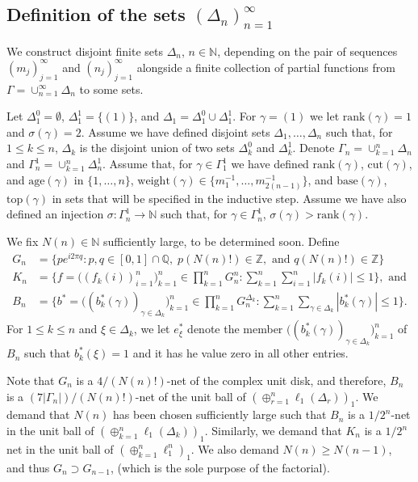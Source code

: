 \documentclass[11pt]{amsart}
\theoremstyle{definition}
\newcommand{\N}{\mathbb{N}}
\newcommand{\Z}{\mathbb{Z}}
\numberwithin{equation}{section}
\begin{document}
\subsection{Definition of the sets $(\Delta_n)_{n=1}^\infty$}
We construct disjoint finite sets $\Delta_n$, $n\in\N$, depending on the pair of sequences $(m_j)_{j=1}^\infty$ and $(n_j)_{j=1}^\infty$ alongside a finite collection of partial functions from $\Gamma = \cup_{n=1}^\infty\Delta_n$ to some sets.

Let $\Delta_1^0 = \emptyset$, $\Delta_1^1 = \{(1)\}$, and $\Delta_1 = \Delta_1^0\cup\Delta_1^1$. For $\gamma = (1)$ we let $\mathrm{rank}(\gamma) = 1$ and $\sigma(\gamma) = 2$. Assume we have defined disjoint sets $\Delta_1,\ldots,\Delta_n$ such that, for $1\leq k\leq n$, $\Delta_k$ is the disjoint union of two sets $\Delta_k^0$ and $\Delta_k^1$. Denote $\Gamma_n = \cup_{k=1}^n\Delta_n$ and $\Gamma^1_n = \cup_{k=1}^n\Delta^1_n$. Assume that, for $\gamma\in\Gamma_1^1$ we have defined $\mathrm{rank}(\gamma)$, $\mathrm{cut}(\gamma)$, and $\mathrm{age}(\gamma)$ in $\{1,\ldots,n\}$, $\mathrm{weight}(\gamma)\in\{m_1^{-1},\ldots,m_{2(n-1)}^{-1}\}$, and $\mathrm{base}(\gamma)$, $\mathrm{top}(\gamma)$ in sets that will be specified in the inductive step. Assume we have also defined an injection $\sigma:\Gamma^1_n\to\N$ such that, for $\gamma\in\Gamma_n^1$, $\sigma(\gamma)>\mathrm{rank}(\gamma)$.

We fix $N(n)\in\N$ sufficiently large, to be determined soon. Define
\begin{align*}
G_n &= \big\{pe^{i2\pi q}:p,q\in[0,1]\cap\mathbb{Q},\;p(N(n)!)\in\Z,\text{ and }q(N(n)!)\in\Z\big\}\\
K_n& = \Big\{f = \big((f_k(i))_{i=1}^n\big)_{k=1}^n\in\prod_{k=1}^nG_n^n:\sum_{k=1}^n\sum_{i=1}^n|f_k(i)|\leq 1\Big\},\text{ and}\\
B_{n} &= \Big\{b^* = \big((b_k^*(\gamma))_{\gamma\in\Delta_k}\big)_{k=1}^n\in\prod_{k=1}^nG_n^{\Delta_k}:\sum_{k=1}^n\sum_{\gamma\in\Delta_k}|b_k^*(\gamma)| \leq 1\Big\}.
\end{align*}
For $1\leq k\leq n$ and $\xi\in\Delta_k$, we let $e_\xi^*$ denote the member $\big((b_k^*(\gamma))_{\gamma\in\Delta_k}\big)_{k=1}^n$ of $B_n$ such that $b^*_k(\xi) = 1$ and it has he value zero in all other entries.

Note that $G_n$ is a $4/(N(n)!)$-net of the complex unit disk, and therefore, $B_{n}$ is a $(7|\Gamma_n|)/(N(n)!)$-net of the unit ball of $(\oplus_{r=1}^n\ell_1(\Delta_r))_1$. We demand that $N(n)$ has been chosen sufficiently large such that $B_{n}$ is a $1/2^n$-net in the unit ball of $(\oplus_{k=1}^n\ell_1(\Delta_k))_1$. Similarly, we demand that $K_n$ is a $1/2^n$ net in the unit ball of $(\oplus_{k=1}^n\ell_1^n)_1$. We also demand $N(n)\geq N(n-1)$, and thus $G_n\supset G_{n-1}$, (which is the sole purpose of the factorial).
\end{document}
